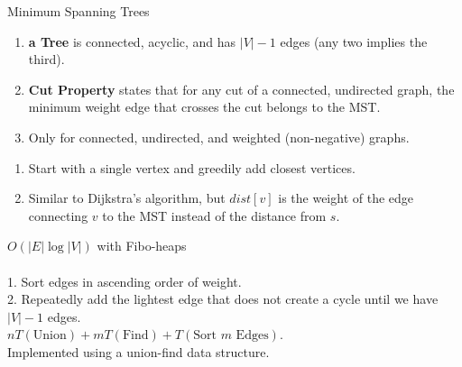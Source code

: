 \documentclass[10pt,a4paper]{article}
\begin{document}
\begin{multicols}{3}
\begin{textbox}{Minimum Spanning Trees}
    \begin{enumerate}
        \item {\bf a Tree} is connected, acyclic, and has $|V|-1$ edges (any two implies the third).
        \item {\bf Cut Property} states that for any cut of a connected, undirected graph, the minimum weight edge that crosses the cut belongs to the MST.
        \item Only for connected, undirected, and weighted (non-negative) graphs.
    \end{enumerate}
    \begin{enumerate}
        \item Start with a single vertex and greedily add closest vertices.
        \item Similar to Dijkstra's algorithm, but $dist[v]$ is the weight of the edge connecting $v$ to the MST instead of the distance from $s$.
    \end{enumerate} 
     $O(|E| \log |V|)$ with Fibo-heaps\\
    \linebreak
    \\
    1. Sort edges in ascending order of weight. \\
    2. Repeatedly add the lightest edge that does not create a cycle until we have $|V|-1$ edges.\\
    \linebreak
     $nT(\text{Union}) + mT(\text{Find}) + T(\text{Sort $m$ Edges})$.\\
     Implemented using a union-find data structure.
\end{textbox}



\end{multicols}
\end{document}
